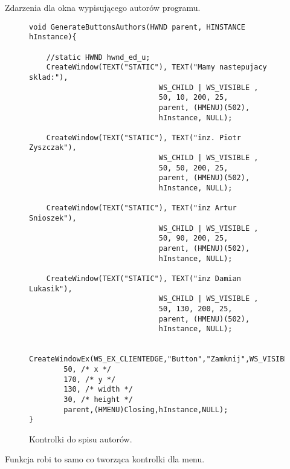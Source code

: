 \documentclass[a4paper,twoside,12pt]{mgr}
\begin{document}
Zdarzenia dla okna wypisującego autorów programu.
\begin{figure}[H]
\centering
\begin{lstlisting}[frame=single]	
void GenerateButtonsAuthors(HWND parent, HINSTANCE hInstance){
	
	//static HWND hwnd_ed_u;
	CreateWindow(TEXT("STATIC"), TEXT("Mamy nastepujacy sklad:"),
                              WS_CHILD | WS_VISIBLE ,
                              50, 10, 200, 25,
                              parent, (HMENU)(502),
                              hInstance, NULL);
							  	
	CreateWindow(TEXT("STATIC"), TEXT("inz. Piotr Zyszczak"),
                              WS_CHILD | WS_VISIBLE ,
                              50, 50, 200, 25,
                              parent, (HMENU)(502),
                              hInstance, NULL);
                              
    CreateWindow(TEXT("STATIC"), TEXT("inz Artur Snioszek"),
                              WS_CHILD | WS_VISIBLE ,
                              50, 90, 200, 25,
                              parent, (HMENU)(502),
                              hInstance, NULL);   
                              
	CreateWindow(TEXT("STATIC"), TEXT("inz Damian Lukasik"),
                              WS_CHILD | WS_VISIBLE ,
                              50, 130, 200, 25,
                              parent, (HMENU)(502),
                              hInstance, NULL);  
                              
	CreateWindowEx(WS_EX_CLIENTEDGE,"Button","Zamknij",WS_VISIBLE|WS_CHILD|BS_PUSHBUTTON,
		50, /* x */
		170, /* y */
		130, /* width */
		30, /* height */
		parent,(HMENU)Closing,hInstance,NULL);                      
}
\end{lstlisting}
\caption{Kontrolki do spisu autorów.}%
\label{rys:etykieta}
\end{figure}
Funkcja robi to samo co tworząca kontrolki dla menu.
\end{document}
